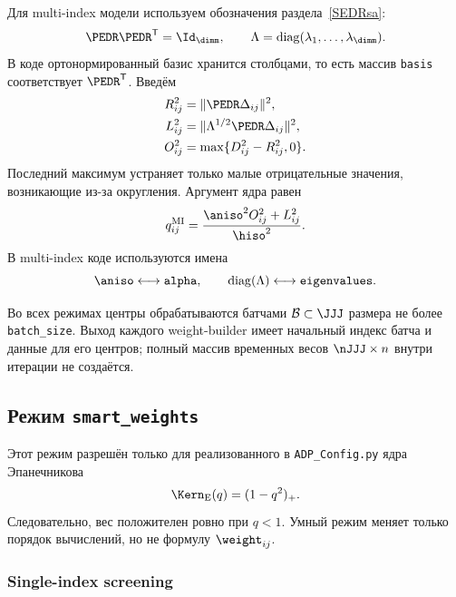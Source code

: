 Для multi-index модели используем обозначения раздела~\ref{SEDRsa}:
\begin{equation}
    \PEDR\PEDR^{\mathsf T}=\Id_{\dimm},
    \qquad
    \Lambda=\operatorname{diag}
    (\lambda_1,\ldots,\lambda_{\dimm}).
\end{equation}
В коде ортонормированный базис хранится столбцами, то есть массив
\texttt{basis} соответствует $\PEDR^{\mathsf T}$. Введём
\begin{align}
    R_{ij}^2
    &=\|\PEDR\Delta_{ij}\|^2,
    \\
    L_{ij}^2
    &=\|\Lambda^{1/2}\PEDR\Delta_{ij}\|^2,
    \\
    O_{ij}^2
    &=\max\{D_{ij}^2-R_{ij}^2,0\}.
\end{align}
Последний максимум устраняет только малые отрицательные значения,
возникающие из-за округления. Аргумент ядра равен
\begin{equation}
    q_{ij}^{\mathrm{MI}}
    =
    \frac{\aniso^2O_{ij}^2+L_{ij}^2}{\hiso^2}.
\label{eq:smart-multi-q}
\end{equation}
В multi-index коде используются имена
\begin{equation}
    \aniso\longleftrightarrow\texttt{alpha},
    \qquad
    \operatorname{diag}(\Lambda)
    \longleftrightarrow\texttt{eigenvalues}.
\end{equation}

Во всех режимах центры обрабатываются батчами
$\mathcal B\subset\JJJ$ размера не более \texttt{batch\_size}.
Выход каждого weight-builder имеет начальный индекс батча и данные
для его центров; полный массив временных весов
$\nJJJ\times n$ внутри итерации не создаётся.

\subsection{Режим \texttt{smart\_weights}}

Этот режим разрешён только для реализованного в
\texttt{ADP\_Config.py} ядра Эпанечникова
\begin{equation}
    \Kern_{\mathrm E}(q)=(1-q^2)_{+}.
\label{eq:smart-epanechnikov}
\end{equation}
Следовательно, вес положителен ровно при $q<1$. Умный режим меняет
только порядок вычислений, но не формулу $\weight_{ij}$.

\subsubsection{Single-index screening}

